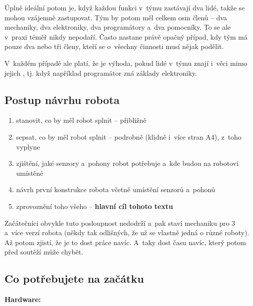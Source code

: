 Úplně ideální potom je, když každou funkci v~týmu zastávají dva lidé, takže se mohou vzájemně zastupovat.
Tým by potom měl celkem osm členů -- dva mechaniky, dva elektroniky, dva programátory a~dva pomocníky.
To se ale v~praxi téměř nikdy nepodaří.
Často nastane právě opačný případ, kdy tým má pouze dva nebo tři členy, kteří se o~všechny činnosti musí nějak podělit.

V~každém případě ale platí, že je výhoda, pokud lidé v~týmu znají i~věci mimo jejich , tj. když například programátor zná základy elektroniky.

\subsection{Postup návrhu robota}

\begin{enumerate} %
\item  stanovit, co by měl robot splnit -- přibližně 
\item  sepsat, co by měl robot splnit -- podrobně (klidně i~více stran A4), z~toho vyplyne
\item  zjištění, jaké senzory a~pohony robot potřebuje a~kde budou na robotovi umístěné
\item  návrh první konstrukce robota včetně umístění senzorů a~pohonů
\item  zprovoznění toho všeho -- {\bf hlavní cíl tohoto textu }
\end{enumerate}


Začátečníci obvykle tuto posloupnost nedodrží a~pak staví mechaniku pro 
3 a~více verzí robota (někdy tak odlišných, že už se vlastně jedná o různé roboty). Až potom zjistí, že je to dost práce navíc.
A~taky dost času navíc, který potom před soutěží může chybět. 

\subsection{Co potřebujete na začátku}

{\bf Hardware: }

